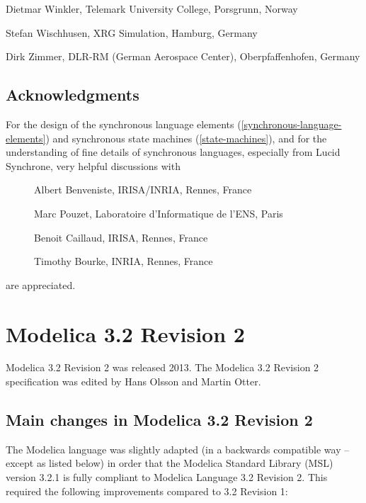 Dietmar Winkler, Telemark University College, Porsgrunn, Norway

Stefan Wischhusen, XRG Simulation, Hamburg, Germany

Dirk Zimmer, DLR-RM (German Aerospace Center), Oberpfaffenhofen, Germany

\subsection{Acknowledgments}

For the design of the synchronous language elements (\ref{synchronous-language-elements}) and
synchronous state machines (\ref{state-machines}), and for the understanding of
fine details of synchronous languages, especially from Lucid Synchrone,
very helpful discussions with

\begin{description}
\item[] Albert Benveniste, IRISA/INRIA, Rennes, France
\item[] Marc Pouzet, Laboratoire d'Informatique de l'ENS, Paris
\item[] Benoit Caillaud, IRISA, Rennes, France
\item[] Timothy Bourke, INRIA, Rennes, France
\end{description}
are appreciated.

\section{Modelica 3.2 Revision 2}

Modelica 3.2 Revision 2 was released 2013. The Modelica 3.2 Revision 2
specification was edited by Hans Olsson and Martin Otter.

\subsection{Main changes in Modelica 3.2 Revision 2}

The Modelica language was slightly adapted (in a backwards compatible
way -- except as listed below) in order that the Modelica Standard
Library (MSL) version 3.2.1 is fully compliant to Modelica Language 3.2
Revision 2. This required the following improvements compared to 3.2
Revision 1:

